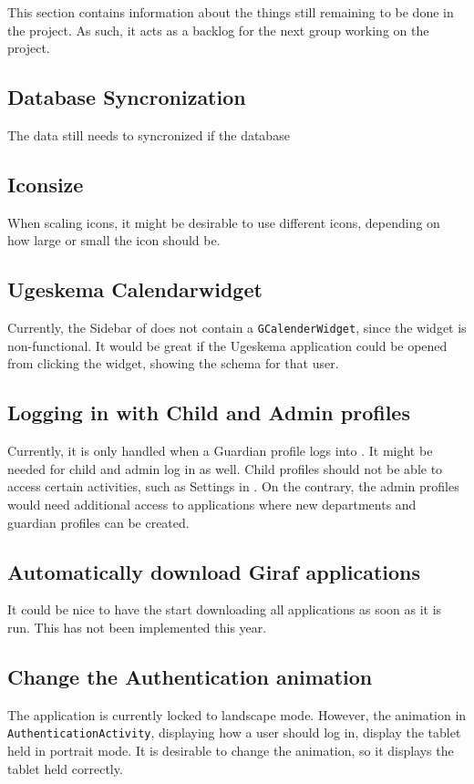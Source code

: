 This section contains information about the things still remaining to be done in the \launcher project.
As such, it acts as a backlog for the next group working on the project.

\subsection{Database Syncronization}
The data still needs to syncronized if the database

\subsection{Iconsize}
When scaling icons, it might be desirable to use different icons, depending on how large or small the icon should be.

\subsection{Ugeskema Calendarwidget}
Currently, the Sidebar of \launcher does not contain a \lstinline!GCalenderWidget!, since the widget is non-functional.
It would be great if the Ugeskema application could be opened from clicking the widget, showing the schema for that user.

\subsection{Logging in with Child and Admin profiles}
Currently, it is only handled when a Guardian profile logs into \launcher.
It might be needed for child and admin log in as well.
Child profiles should not be able to access certain activities, such as Settings in \launcher.
On the contrary, the admin profiles would need additional access to applications where new departments and guardian profiles can be created.

\subsection{Automatically download Giraf applications}
It could be nice to have the \launcher start downloading all \giraf applications as soon as it is run.
This has not been implemented this year.
 
\subsection{Change the Authentication animation}
The application is currently locked to landscape mode.
However, the animation in \lstinline!AuthenticationActivity!, displaying how a user should log in, display the tablet held in portrait mode.
It is desirable to change the animation, so it displays the tablet held correctly.


